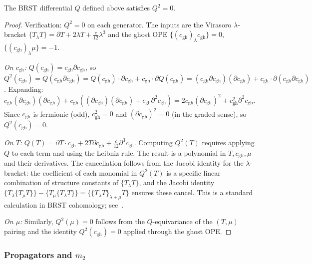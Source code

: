 \begin{lemma}[Nilpotency $Q^2 = 0$]
The BRST differential $Q$ defined above satisfies $Q^2 = 0$.
\end{lemma}
\begin{proof}
Verification: $Q^2 = 0$ on each generator. The inputs are the Virasoro $\lambda$-bracket $\{T_\lambda T\} = \partial T + 2\lambda T + \frac{c}{12}\lambda^3$ and the ghost OPE $\{(c_{\mathrm{gh}})_\lambda c_{\mathrm{gh}}\} = 0$, $\{(c_{\mathrm{gh}})_\lambda \mu\} = -1$.

\emph{On $c_{\mathrm{gh}}$:} $Q(c_{\mathrm{gh}}) = c_{\mathrm{gh}}\partial c_{\mathrm{gh}}$, so $Q^2(c_{\mathrm{gh}}) = Q(c_{\mathrm{gh}}\partial c_{\mathrm{gh}}) = Q(c_{\mathrm{gh}})\cdot\partial c_{\mathrm{gh}} + c_{\mathrm{gh}}\cdot\partial Q(c_{\mathrm{gh}}) = (c_{\mathrm{gh}}\partial c_{\mathrm{gh}})(\partial c_{\mathrm{gh}}) + c_{\mathrm{gh}}\cdot\partial(c_{\mathrm{gh}}\partial c_{\mathrm{gh}})$. Expanding: $c_{\mathrm{gh}}(\partial c_{\mathrm{gh}})(\partial c_{\mathrm{gh}}) + c_{\mathrm{gh}}((\partial c_{\mathrm{gh}})(\partial c_{\mathrm{gh}}) + c_{\mathrm{gh}}\partial^2 c_{\mathrm{gh}}) = 2c_{\mathrm{gh}}(\partial c_{\mathrm{gh}})^2 + c_{\mathrm{gh}}^2\partial^2 c_{\mathrm{gh}}$. Since $c_{\mathrm{gh}}$ is fermionic (odd), $c_{\mathrm{gh}}^2 = 0$ and $(\partial c_{\mathrm{gh}})^2 = 0$ (in the graded sense), so $Q^2(c_{\mathrm{gh}}) = 0$.

\emph{On $T$:} $Q(T) = \partial T \cdot c_{\mathrm{gh}} + 2T\partial c_{\mathrm{gh}} + \frac{c}{12}\partial^3 c_{\mathrm{gh}}$. Computing $Q^2(T)$ requires applying $Q$ to each term and using the Leibniz rule. The result is a polynomial in $T, c_{\mathrm{gh}}, \mu$ and their derivatives. The cancellation follows from the Jacobi identity for the $\lambda$-bracket: the coefficient of each monomial in $Q^2(T)$ is a specific linear combination of structure constants of $\{T_\lambda T\}$, and the Jacobi identity $\{T_\lambda \{T_\mu T\}\} - \{T_\mu \{T_\lambda T\}\} = \{\{T_\lambda T\}_{\lambda+\mu} T\}$ ensures these cancel. This is a standard calculation in BRST cohomology; see~\cite{FMS86}.

\emph{On $\mu$:} Similarly, $Q^2(\mu) = 0$ follows from the $Q$-equivariance of the $(T,\mu)$ pairing and the identity $Q^2(c_{\mathrm{gh}}) = 0$ applied through the ghost OPE.
\end{proof}

\subsubsection{Propagators and $m_2$}

